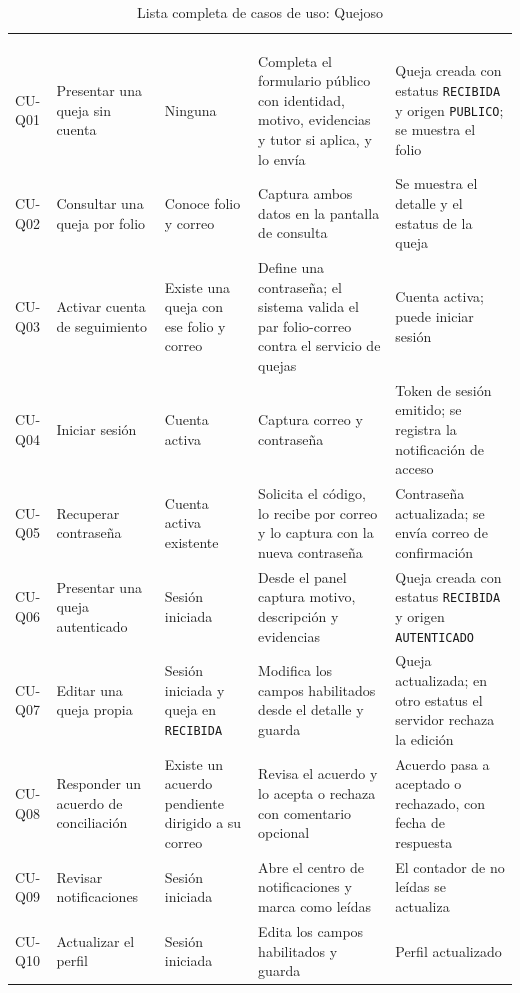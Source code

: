 \footnotesize
\renewcommand{\arraystretch}{1.2}
\setlength{\tabcolsep}{4pt}
\begin{longtable}{|L{1.6cm}|L{3.0cm}|L{2.9cm}|L{4.2cm}|L{3.5cm}|}
	\hiderowcolors\caption{Lista completa de casos de uso: Quejoso}
	\label{tab:anx_cu_quejoso} \\ \showrowcolors
	\hline
	 &  &  &  &  \\
	\hline
	\endfirsthead
	\hline
	 &  &  &  &  \\
	\hline
	\endhead
	CU-Q01 & Presentar una queja sin cuenta & Ninguna & Completa el formulario público con identidad, motivo, evidencias y tutor si aplica, y lo envía & Queja creada con estatus \texttt{RECIBIDA} y origen \texttt{PUBLICO}; se muestra el folio \\ \hline
	CU-Q02 & Consultar una queja por folio & Conoce folio y correo & Captura ambos datos en la pantalla de consulta & Se muestra el detalle y el estatus de la queja \\ \hline
	CU-Q03 & Activar cuenta de seguimiento & Existe una queja con ese folio y correo & Define una contraseña; el sistema valida el par folio-correo contra el servicio de quejas & Cuenta activa; puede iniciar sesión \\ \hline
	CU-Q04 & Iniciar sesión & Cuenta activa & Captura correo y contraseña & Token de sesión emitido; se registra la notificación de acceso \\ \hline
	CU-Q05 & Recuperar contraseña & Cuenta activa existente & Solicita el código, lo recibe por correo y lo captura con la nueva contraseña & Contraseña actualizada; se envía correo de confirmación \\ \hline
	CU-Q06 & Presentar una queja autenticado & Sesión iniciada & Desde el panel captura motivo, descripción y evidencias & Queja creada con estatus \texttt{RECIBIDA} y origen \texttt{AUTENTICADO} \\ \hline
	CU-Q07 & Editar una queja propia & Sesión iniciada y queja en \texttt{RECIBIDA} & Modifica los campos habilitados desde el detalle y guarda & Queja actualizada; en otro estatus el servidor rechaza la edición \\ \hline
	CU-Q08 & Responder un acuerdo de conciliación & Existe un acuerdo pendiente dirigido a su correo & Revisa el acuerdo y lo acepta o rechaza con comentario opcional & Acuerdo pasa a aceptado o rechazado, con fecha de respuesta \\ \hline
	CU-Q09 & Revisar notificaciones & Sesión iniciada & Abre el centro de notificaciones y marca como leídas & El contador de no leídas se actualiza \\ \hline
	CU-Q10 & Actualizar el perfil & Sesión iniciada & Edita los campos habilitados y guarda & Perfil actualizado \\ \hline
\end{longtable}
\normalsize
\setlength{\tabcolsep}{6pt}
\renewcommand{\arraystretch}{1}

